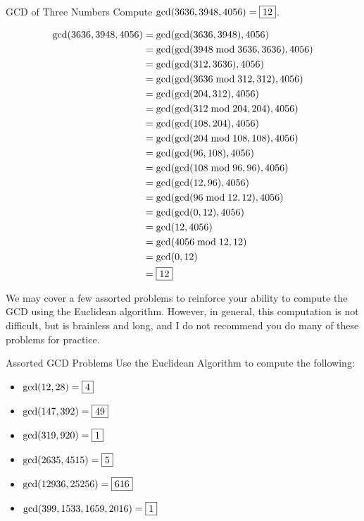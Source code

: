 \documentclass[a4paper,10pt]{report}
\begin{document}
\begin{problem}{GCD of Three Numbers}
 Compute $\gcd(3636, 3948, 4056) = \Ans{12}$.

 \begin{solution}
  \begin{align*}
   \gcd(3636, 3948, 4056)
   &= \gcd(\gcd(3636, 3948), 4056) \\
   &= \gcd(\gcd(3948 \bmod 3636, 3636), 4056) \\
   &= \gcd(\gcd(312, 3636), 4056) \\
   &= \gcd(\gcd(3636 \bmod 312, 312), 4056) \\
   &= \gcd(\gcd(204, 312), 4056) \\
   &= \gcd(\gcd(312 \bmod 204, 204), 4056) \\
   &= \gcd(\gcd(108, 204), 4056) \\
   &= \gcd(\gcd(204 \bmod 108, 108), 4056) \\
   &= \gcd(\gcd(96, 108), 4056) \\
   &= \gcd(\gcd(108 \bmod 96, 96), 4056) \\
   &= \gcd(\gcd(12, 96), 4056) \\
   &= \gcd(\gcd(96 \bmod 12, 12), 4056) \\
   &= \gcd(\gcd(0, 12), 4056) \\
   &= \gcd(12, 4056) \\
   &= \gcd(4056 \bmod 12, 12) \\
   &= \gcd(0, 12) \\
   &= \Ans{12}
  \end{align*}
 \end{solution}
\end{problem}

We may cover a few assorted problems to reinforce your ability to compute the
GCD using the Euclidean algorithm. However, in general, this computation is not
difficult, but is brainless and long, and I do not recommend you do many of
these problems for practice.

\begin{problem}{Assorted GCD Problems}
 Use the Euclidean Algorithm to compute the following:

 \begin{itemize}
  \item $\gcd(12, 28) = \Ans{4}$
  \item $\gcd(147, 392) = \Ans{49}$
  \item $\gcd(319, 920) = \Ans{1}$
  \item $\gcd(2635, 4515) = \Ans{5}$
  \item $\gcd(12936, 25256) = \Ans{616}$
  \item $\gcd(399, 1533, 1659, 2016) = \Ans{1}$
 \end{itemize}
\end{problem}
\end{document}
